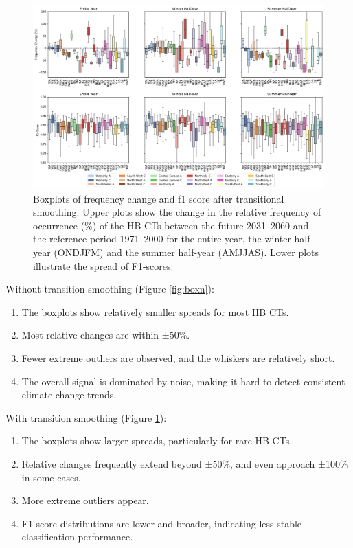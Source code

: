 \documentclass[
]{krantz}
\providecommand{\tightlist}{%
  \setlength{\itemsep}{0pt}\setlength{\parskip}{0pt}}
\begin{document}
\begin{figure}

{\centering \includegraphics[width=0.7\linewidth]{work/01-weatherpattern/figures/combined_boxplot} 

}

\caption{Boxplots of frequency change and f1 score after transitional smoothing. Upper plots show the change in the relative frequency of occurrence (\%) of the HB CTs between the future 2031–2060 and the reference period 1971–2000 for the entire year, the winter half-year (ONDJFM) and the summer half-year (AMJJAS).  Lower plots illustrate the spread of F1-scores.}\label{fig:box}
\end{figure}

Without transition smoothing (Figure \ref{fig:boxn}):

\begin{enumerate}
\def\labelenumi{\arabic{enumi}.}
\tightlist
\item
  The boxplots show relatively smaller spreads for most HB CTs.
\item
  Most relative changes are within ±50\%.
\item
  Fewer extreme outliers are observed, and the whiskers are relatively short.
\item
  The overall signal is dominated by noise, making it hard to detect consistent climate change trends.
\end{enumerate}

With transition smoothing (Figure \ref{fig:box}):

\begin{enumerate}
\def\labelenumi{\arabic{enumi}.}
\tightlist
\item
  The boxplots show larger spreads, particularly for rare HB CTs.
\item
  Relative changes frequently extend beyond ±50\%, and even approach ±100\% in some cases.
\item
  More extreme outliers appear.
\item
  F1-score distributions are lower and broader, indicating less stable classification performance.
\end{enumerate}
\end{document}
